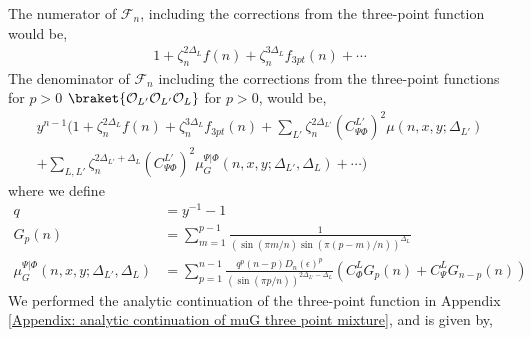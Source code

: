 \documentclass[11pt]{article}
\newcommand{\ep}{\epsilon}
\newcommand{\mO}{\mathcal{O}}
\newcommand{\nn}{\nonumber}
\newcommand{\lb}{\left(}
\newcommand{\rb}{\right)}
\begin{document}
The numerator of $\mathcal{F}_n$, including the corrections from the three-point function would be,
\begin{align}
    1 + \zeta_n^{2\Delta_L}f(n) + \zeta_n^{3\Delta_L}f_{3pt}(n) + \cdots
\end{align}
The denominator of $\mathcal{F}_n$ including the corrections from the three-point functions for $p> 0$ $\braket{\mO_{L'} \mO_{L'}\mO_L}$ for $p>0$, would be,
\begin{align}
y^{n-1}\Bigg( 1+ \zeta_n^{2\Delta_L} f(n)  +  \zeta_n^{3\Delta_L}f_{3pt}(n) + \sum_{L'} \zeta_n^{2\Delta_{L'} } {(C_{\Psi\Phi}^{L'})}^2 \mu(n,x,y;\Delta_{L'}) \nn\\
+ \sum_{L,L'}\zeta_n^{2\Delta_{L'} + \Delta_L}{(C_{\Psi\Phi}^{L'})}^2\mu_G^{\Psi|\Phi}(n,x,y;\Delta_{L'},\Delta_L)+\cdots\Bigg)
\end{align}
where we define
\begin{align}
    q &= y^{-1}-1 \\
    G_p(n) &= \sum_{m=1}^{p-1} \frac{1}{\lb \sin(\pi m/n) \sin(\pi (p-m)/n)\rb^{\Delta_L}}\\
    \mu_G^{\Psi|\Phi} (n,x,y;\Delta_{L'},\Delta_L) &= \sum_{p=1}^{n-1}   \frac{q^p (n-p)D_n(\ep)^{p}}{\lb \sin(\pi p/n)\rb^{2\Delta_{L'}-\Delta_L}} \lb C_\Phi^L G_p(n) + C_\Psi^L G_{n-p}(n)\rb
\end{align}
We performed the analytic continuation of the three-point function in Appendix \ref{Appendix: analytic continuation of muG three point mixture}, and is given by,
\end{document}
